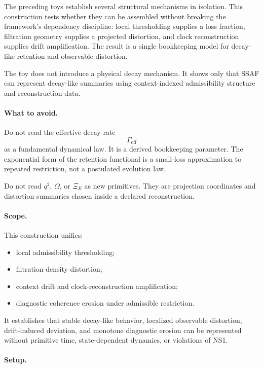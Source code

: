 \documentclass[aps,prx,onecolumn,11pt]{revtex4-2}
\theoremstyle{plain}
\theoremstyle{definition}
\theoremstyle{remark}
\begin{document}
The preceding toys establish several structural mechanisms in isolation.
This construction tests whether they can be assembled without breaking
the framework's dependency discipline: local thresholding supplies a
loss fraction, filtration geometry supplies a projected distortion, and
clock reconstruction supplies drift amplification. The result is a
single bookkeeping model for decay-like retention and observable
distortion.

The toy does not introduce a physical decay mechanism. It shows only
that SSAF can represent decay-like summaries using context-indexed
admissibility structure and reconstruction data.

\paragraph{What to avoid.}

Do not read the effective decay rate
\[
\Gamma_{\mathrm{eff}}
\]
as a fundamental dynamical law. It is a derived bookkeeping parameter.
The exponential form of the retention functional is a small-loss
approximation to repeated restriction, not a postulated evolution law.

Do not read \(q^2\), \(\Omega\), or \(\Xi_E\) as new primitives. They
are projection coordinates and distortion summaries chosen inside a
declared reconstruction.

\paragraph{Scope.}

This construction unifies:

\begin{itemize}[leftmargin=2em]
\item local admissibility thresholding;
\item filtration-density distortion;
\item context drift and clock-reconstruction amplification;
\item diagnostic coherence erosion under admissible restriction.
\end{itemize}

It establishes that stable decay-like behavior, localized observable
distortion, drift-induced deviation, and monotone diagnostic erosion can
be represented without primitive time, state-dependent dynamics, or
violations of NS1.

\paragraph{Setup.}
\end{document}
